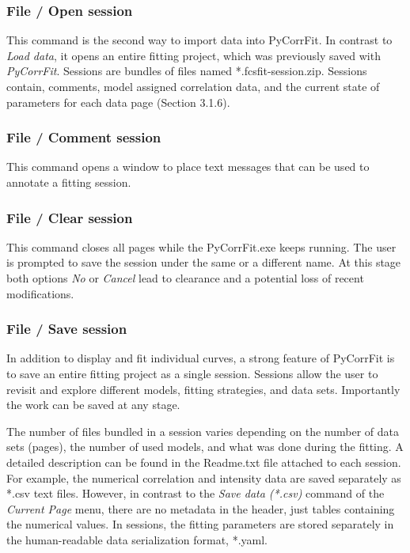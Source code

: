 \subsubsection{File / Open session}
\label{sec:fm.os}
This command is the second way to import data into PyCorrFit. In contrast to \textit{Load data}, it opens an entire fitting project, which was previously saved with \textit{PyCorrFit}. Sessions are bundles of files named *.fcsfit-session.zip. Sessions contain, comments, model assigned correlation data, and the current state of parameters for each data page (Section 3.1.6).

\subsubsection{File / Comment session}
\label{sec:fm.cs}
This command opens a window to place text messages that can be used to annotate a fitting session.

\subsubsection{File / Clear session}
\label{sec:cls}
This command closes all pages while the PyCorrFit.exe keeps running. The user is prompted to save the session under the same or a different name. At this stage both options \textit{No} or \textit{Cancel} lead to clearance and a potential loss of recent modifications.

\subsubsection{File / Save session}
\label{sec:fm.ss}
In addition to display and fit individual curves, a strong feature of PyCorrFit is to save an entire fitting project as a single session. Sessions allow the user to revisit and explore different models, fitting strategies, and data sets. Importantly the work can be saved at any stage.

The number of files bundled in a session varies depending on the number of data sets (pages), the number of used models, and what was done during the fitting. A detailed description can be found in the Readme.txt file attached to each session. For example, the numerical correlation and intensity data are saved separately as *.csv text files. However, in contrast to the \textit{Save data (*.csv)} command of the \textit{Current Page} menu, there are no metadata in the header, just tables containing the numerical values. In sessions, the fitting parameters are stored separately in the human-readable data serialization format, *.yaml.

